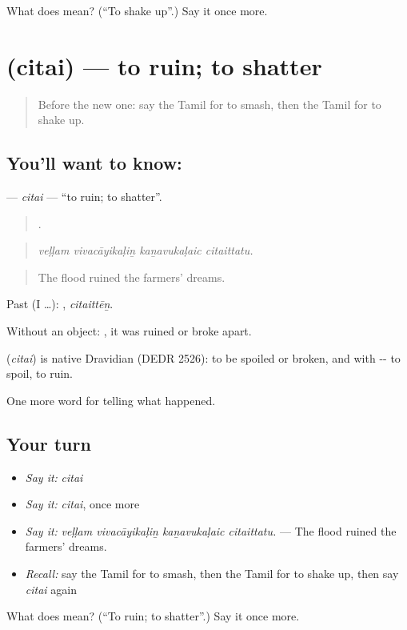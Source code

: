 \begin{tcolorbox}[breakable,colback=teal!4,colframe=teal!35!black,title={Before you move on}]
What does  mean? (\textquotedblleft{}To shake up\textquotedblright{}.) Say it once more.
\end{tcolorbox}
\section[\texorpdfstring{\ta{சிதை} (citai)}{சிதை (citai)}]{ (citai) — to ruin; to shatter}

\label{lesson:TA-C304-citai}



\begin{quote}
Before the new one: say the Tamil for to smash, then the Tamil for to shake up.
\end{quote}

\subsection*{You'll want to know: }
\textbf{} — \emph{citai} — \textquotedblleft{}to ruin; to shatter\textquotedblright{}.

\begin{quote}
   .
\end{quote}

\begin{quote}
\emph{veḷḷam vivacāyikaḷiṉ kaṉavukaḷaic citaittatu.}
\end{quote}

\begin{quote}
The flood ruined the farmers' dreams.
\end{quote}

Past (I …): , \emph{citaittēṉ}.

Without an object: , it was ruined or broke apart.

\begin{cousinweb}
\textbf{} (\emph{citai}) is native Dravidian (DEDR 2526): to be spoiled or broken, and with -- to spoil, to ruin.
\end{cousinweb}

\begin{grammarlens}[title={What you've built}]
One more word for telling what happened.
\end{grammarlens}

\subsection*{Your turn}
\begin{itemize}
\raggedright
  \item \emph{Say it:} \emph{citai}
  \item \emph{Say it:} \emph{citai}, once more
  \item \emph{Say it:} \emph{veḷḷam vivacāyikaḷiṉ kaṉavukaḷaic citaittatu.} — The flood ruined the farmers' dreams.
  \item \emph{Recall:} say the Tamil for to smash, then the Tamil for to shake up, then say \emph{citai} again
\end{itemize}

\begin{tcolorbox}[breakable,colback=teal!4,colframe=teal!35!black,title={Before you move on}]
What does  mean? (\textquotedblleft{}To ruin; to shatter\textquotedblright{}.) Say it once more.
\end{tcolorbox}
